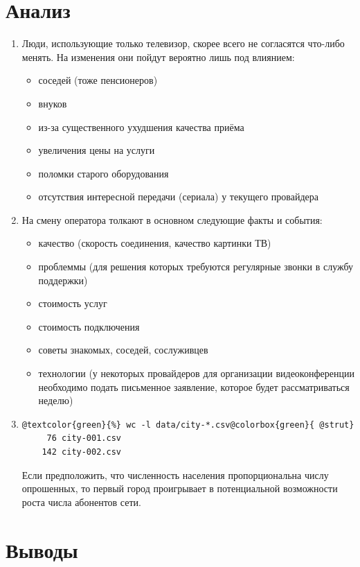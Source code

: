 \documentclass[unicode, 12pt, a4paper,oneside,fleqn]{article}
\begin{document}
\section{Анализ}
\begin{enumerate}
\item Люди, использующие только телевизор, скорее всего не согласятся
  что-либо менять. На изменения они пойдут вероятно лишь под влиянием:
  \begin{itemize}
  \item соседей (тоже пенсионеров)
  \item внуков
  \item из-за существенного ухудшения качества приёма
  \item увеличения цены на услуги
  \item поломки старого оборудования
  \item отсутствия интересной передачи (сериала) у текущего провайдера
  \end{itemize}
\item На смену оператора толкают в основном следующие факты и события:
  \begin{itemize}
  \item качество (скорость соединения, качество картинки ТВ)
  \item проблеммы (для решения которых требуются регулярные звонки в
    службу поддержки)
  \item стоимость услуг
  \item стоимость подключения
  \item советы знакомых, соседей, сослуживцев
  \item технологии (у некоторых провайдеров для организации
    видеоконференции необходимо подать письменное заявление, которое
    будет рассматриваться неделю)
  \end{itemize}
\item
  \begin{Verbatim}[commandchars=@\{\}]
    @textcolor{green}{%} wc -l data/city-*.csv@colorbox{green}{ @strut}
     76 city-001.csv
    142 city-002.csv
  \end{Verbatim}
  Если предположить, что численность населения пропорциональна числу
  опрошенных, то первый город проигрывает в потенциальной возможности
  роста числа абонентов сети.
\end{enumerate}
\section{Выводы}
\end{document}
